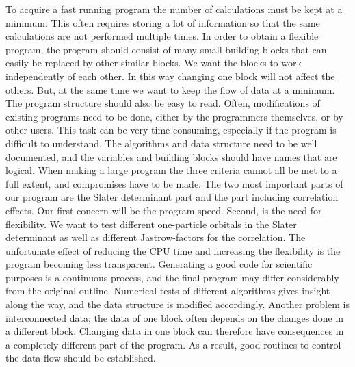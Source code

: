 To acquire a fast running program the number of calculations must be
kept at a minimum. This often requires storing a lot of information so
that the same calculations are not performed multiple times. 
\newline
%
\newline
In order to obtain a flexible program, the program should consist of
many small building blocks that can easily be replaced by other similar
blocks. We want the blocks to work independently of each other. In
this way changing one block will not affect the others. But, at the
same time we want to keep the flow of data at a minimum.
\newline
%
\newline
The program structure should also
be easy to read. Often, modifications of existing programs need to be
done, either by the programmers themselves, or by other users. This
task can be very time consuming, especially if the program is
difficult to understand. The algorithms and data structure need to be
well documented, and the variables and building blocks should have
names that are logical.
\newline
%
\newline
When making a large program the three criteria cannot all be met to a
full extent, and compromises have to be made. The two most important
parts of our program are the Slater 
determinant part and the part including correlation
effects. Our first concern will be the program 
speed. Second, is the need for flexibility. We want to test different
one-particle orbitals in the Slater determinant as well as different
Jastrow-factors for the correlation. The unfortunate effect of
reducing the CPU time and increasing the flexibility is the
program becoming less transparent. 
\newline
%
\newline
Generating a good code for scientific purposes is a continuous
process, and the final program may differ considerably from the original
outline. Numerical tests of different algorithms gives insight along
the way, and the data structure is modified accordingly. 
Another problem is interconnected data; the data of one block often
depends on the changes done in a different block. Changing data in one
block can therefore have consequences in a completely different
part of the program. As a result, good routines to control the
data-flow should be established.





